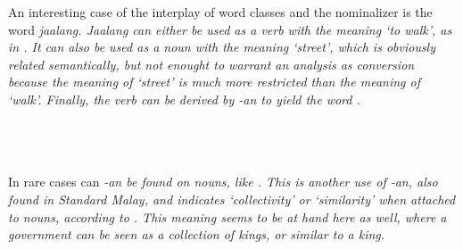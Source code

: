 An interesting case of the interplay of word classes and the nominalizer is the word \em jaalang\em. \em Jaalang \em can either be used as a verb with the meaning `to walk', as in . It can also be used as a noun with the meaning `street', which is obviously related semantically, but not enought to warrant an analysis as conversion because the meaning of `street' is much more restricted than the meaning of `walk'. Finally, the verb  can be derived by \em -an \em to yield the word  . 

 \\
 \\
 \\


In rare cases can \em -an \em be found on nouns, like . This is another use of \em -an\em, also found in Standard Malay, and indicates `collectivity' or `similarity'  when attached to nouns, according to \citet[193]{Adelaar1985}. This meaning seems to be at hand here as well, where a government can be seen as a collection of kings, or similar to a king.

